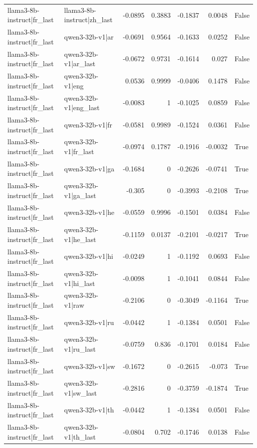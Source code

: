 \begin{table}
\begin{tabular}{l l r r r r l}
llama3-8b-instruct|fr_last & llama3-8b-instruct|zh_last & -0.0895 & 0.3883 & -0.1837 & 0.0048 & False \\
llama3-8b-instruct|fr_last & qwen3-32b-v1|ar & -0.0691 & 0.9564 & -0.1633 & 0.0252 & False \\
llama3-8b-instruct|fr_last & qwen3-32b-v1|ar_last & -0.0672 & 0.9731 & -0.1614 & 0.027 & False \\
llama3-8b-instruct|fr_last & qwen3-32b-v1|eng & 0.0536 & 0.9999 & -0.0406 & 0.1478 & False \\
llama3-8b-instruct|fr_last & qwen3-32b-v1|eng_last & -0.0083 & 1 & -0.1025 & 0.0859 & False \\
llama3-8b-instruct|fr_last & qwen3-32b-v1|fr & -0.0581 & 0.9989 & -0.1524 & 0.0361 & False \\
llama3-8b-instruct|fr_last & qwen3-32b-v1|fr_last & -0.0974 & 0.1787 & -0.1916 & -0.0032 & True \\
llama3-8b-instruct|fr_last & qwen3-32b-v1|ga & -0.1684 & 0 & -0.2626 & -0.0741 & True \\
llama3-8b-instruct|fr_last & qwen3-32b-v1|ga_last & -0.305 & 0 & -0.3993 & -0.2108 & True \\
llama3-8b-instruct|fr_last & qwen3-32b-v1|he & -0.0559 & 0.9996 & -0.1501 & 0.0384 & False \\
llama3-8b-instruct|fr_last & qwen3-32b-v1|he_last & -0.1159 & 0.0137 & -0.2101 & -0.0217 & True \\
llama3-8b-instruct|fr_last & qwen3-32b-v1|hi & -0.0249 & 1 & -0.1192 & 0.0693 & False \\
llama3-8b-instruct|fr_last & qwen3-32b-v1|hi_last & -0.0098 & 1 & -0.1041 & 0.0844 & False \\
llama3-8b-instruct|fr_last & qwen3-32b-v1|raw & -0.2106 & 0 & -0.3049 & -0.1164 & True \\
llama3-8b-instruct|fr_last & qwen3-32b-v1|ru & -0.0442 & 1 & -0.1384 & 0.0501 & False \\
llama3-8b-instruct|fr_last & qwen3-32b-v1|ru_last & -0.0759 & 0.836 & -0.1701 & 0.0184 & False \\
llama3-8b-instruct|fr_last & qwen3-32b-v1|sw & -0.1672 & 0 & -0.2615 & -0.073 & True \\
llama3-8b-instruct|fr_last & qwen3-32b-v1|sw_last & -0.2816 & 0 & -0.3759 & -0.1874 & True \\
llama3-8b-instruct|fr_last & qwen3-32b-v1|th & -0.0442 & 1 & -0.1384 & 0.0501 & False \\
llama3-8b-instruct|fr_last & qwen3-32b-v1|th_last & -0.0804 & 0.702 & -0.1746 & 0.0138 & False \\

\end{tabular}
\end{table}
